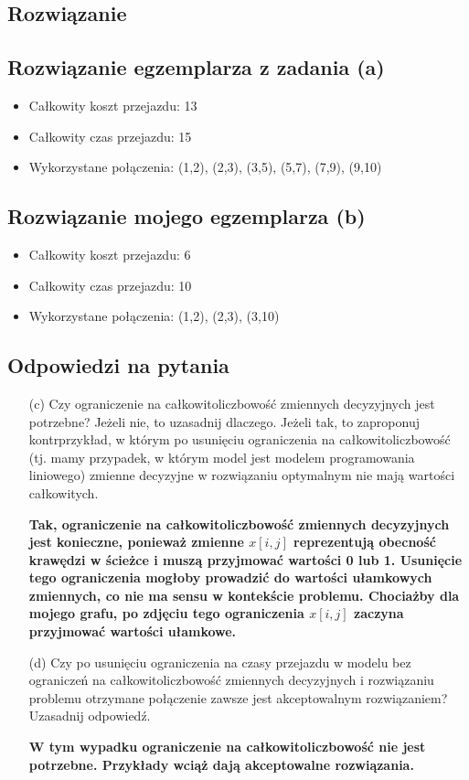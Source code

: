 \documentclass{article}
\begin{document}
\subsection{Rozwiązanie}
\subsection{Rozwiązanie egzemplarza z zadania (a)}
\begin{itemize}
    \item Całkowity koszt przejazdu: 13
    \item Całkowity czas przejazdu: 15
    \item Wykorzystane połączenia: (1,2), (2,3), (3,5), (5,7), (7,9), (9,10)
\end{itemize}

\subsection{Rozwiązanie mojego egzemplarza (b)}
\begin{itemize}
    \item Całkowity koszt przejazdu: 6
    \item Całkowity czas przejazdu: 10
    \item Wykorzystane połączenia: (1,2), (2,3), (3,10)
\end{itemize}

\subsection{Odpowiedzi na pytania}

\begin{enumerate}
    \item[(c)] Czy ograniczenie na całkowitoliczbowość zmiennych decyzyjnych jest potrzebne? Jeżeli nie, to uzasadnij dlaczego. Jeżeli tak, to zaproponuj kontrprzykład, w którym po usunięciu ograniczenia na całkowitoliczbowość (tj. mamy przypadek, w którym model jest modelem programowania liniowego) zmienne decyzyjne w rozwiązaniu optymalnym nie mają wartości całkowitych.

    \textbf{Tak, ograniczenie na całkowitoliczbowość zmiennych decyzyjnych jest konieczne, ponieważ zmienne \(x[i,j]\) reprezentują obecność krawędzi w ścieżce i muszą przyjmować wartości 0 lub 1. Usunięcie tego ograniczenia mogłoby prowadzić do wartości ułamkowych zmiennych, co nie ma sensu w kontekście problemu. Chociażby dla mojego grafu, po zdjęciu tego ograniczenia $x[i, j]$ zaczyna przyjmować wartości ułamkowe.}

    \item[(d)] Czy po usunięciu ograniczenia na czasy przejazdu w modelu bez ograniczeń na całkowitoliczbowość zmiennych decyzyjnych i rozwiązaniu problemu otrzymane połączenie zawsze jest akceptowalnym rozwiązaniem? Uzasadnij odpowiedź.

    \textbf{W tym wypadku ograniczenie na całkowitoliczbowość nie jest potrzebne. Przykłady wciąż dają akceptowalne rozwiązania.}
\end{enumerate}
\end{document}
